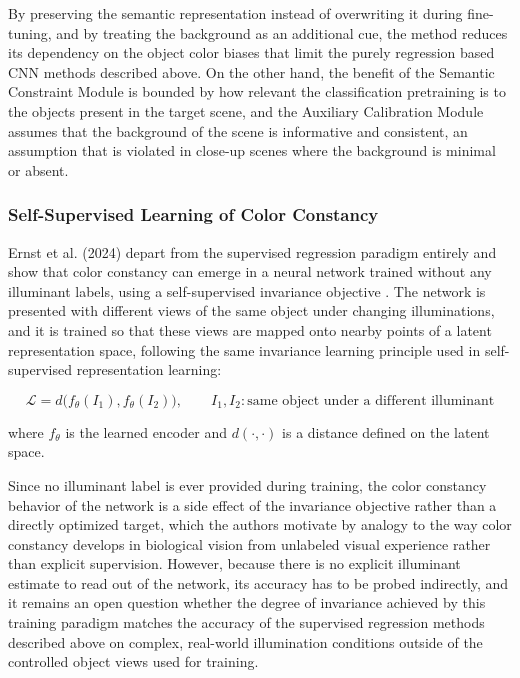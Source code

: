 By preserving the semantic representation instead of overwriting it during fine-tuning, and by treating the background as an additional cue, the method reduces its dependency on the object color biases that limit the purely regression based CNN methods described above. On the other hand, the benefit of the Semantic Constraint Module is bounded by how relevant the classification pretraining is to the objects present in the target scene, and the Auxiliary Calibration Module assumes that the background of the scene is informative and consistent, an assumption that is violated in close-up scenes where the background is minimal or absent.

\subsubsection{Self-Supervised Learning of Color Constancy}

Ernst et al. (2024) depart from the supervised regression paradigm entirely and show that color constancy can emerge in a neural network trained without any illuminant labels, using a self-supervised invariance objective \cite{ernst2024self}. The network is presented with different views of the same object under changing illuminations, and it is trained so that these views are mapped onto nearby points of a latent representation space, following the same invariance learning principle used in self-supervised representation learning:

\begin{equation}
\mathcal{L} = d\big(f_{\theta}(I_1), f_{\theta}(I_2)\big), \qquad I_1, I_2: \text{same object under a different illuminant}
\end{equation}

where $f_{\theta}$ is the learned encoder and $d(\cdot,\cdot)$ is a distance defined on the latent space.

Since no illuminant label is ever provided during training, the color constancy behavior of the network is a side effect of the invariance objective rather than a directly optimized target, which the authors motivate by analogy to the way color constancy develops in biological vision from unlabeled visual experience rather than explicit supervision. However, because there is no explicit illuminant estimate to read out of the network, its accuracy has to be probed indirectly, and it remains an open question whether the degree of invariance achieved by this training paradigm matches the accuracy of the supervised regression methods described above on complex, real-world illumination conditions outside of the controlled object views used for training.

